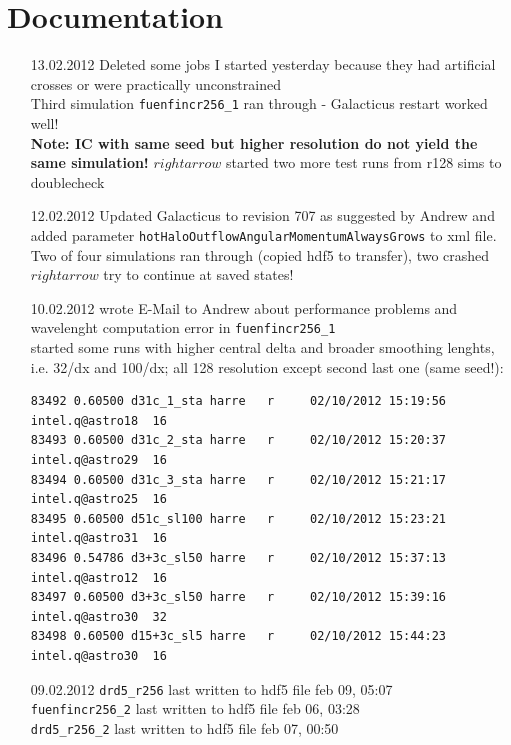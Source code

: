 \documentclass[a4paper,11pt,fleqn,oneside]{book}
\begin{document}
\tableofcontents


\chapter{Documentation}

\begin{itemize}
\item[13.02.2012]
Deleted some jobs I started yesterday because they had artificial crosses 
or were practically unconstrained \\
Third simulation \texttt{fuenfincr256\_1} ran through - Galacticus 
restart worked well! \\
\textbf{Note: IC with same seed but higher resolution do not yield the same 
simulation!} $rightarrow$ started two more test runs from r128 sims to doublecheck \\


\item[12.02.2012]
Updated Galacticus to revision 707 as suggested by Andrew and added parameter 
\texttt{hotHaloOutflowAngularMomentumAlwaysGrows} to xml file. \\
Two of four simulations ran through (copied hdf5 to transfer), 
two crashed $rightarrow$ try to continue at saved states!


\item[10.02.2012]
wrote E-Mail to Andrew about performance problems and wavelenght computation error 
in \texttt{fuenfincr256\_1} \\
started some runs with higher central delta and broader smoothing lenghts, i.e. 
32/dx and 100/dx; all 128 resolution except second last one (same seed!): 
\begin{verbatim}
83492 0.60500 d31c_1_sta harre   r     02/10/2012 15:19:56 intel.q@astro18  16        
83493 0.60500 d31c_2_sta harre   r     02/10/2012 15:20:37 intel.q@astro29  16        
83494 0.60500 d31c_3_sta harre   r     02/10/2012 15:21:17 intel.q@astro25  16        
83495 0.60500 d51c_sl100 harre   r     02/10/2012 15:23:21 intel.q@astro31  16  
83496 0.54786 d3+3c_sl50 harre   r     02/10/2012 15:37:13 intel.q@astro12  16        
83497 0.60500 d3+3c_sl50 harre   r     02/10/2012 15:39:16 intel.q@astro30  32  
83498 0.60500 d15+3c_sl5 harre   r     02/10/2012 15:44:23 intel.q@astro30  16        
\end{verbatim}

\item[09.02.2012]
\texttt{drd5\_r256} last written to hdf5 file feb 09, 05:07 \\
\texttt{fuenfincr256\_2} last written to hdf5 file feb 06, 03:28 \\
\texttt{drd5\_r256\_2} last written to hdf5 file feb 07, 00:50 \\


\end{itemize}
\end{document}
